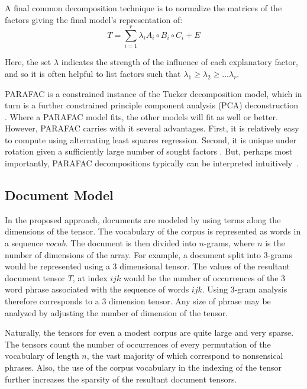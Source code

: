 \documentclass{article}
\begin{document}
A final common decomposition technique is to normalize the matrices
of the factors giving the final model's representation of:
\begin{equation}
    \label{eq:parafac-lambda}
    T = \displaystyle\sum_{i=1}^{r} \lambda_i A_i \circ B_i \circ C_i
    + E
\end{equation}

Here, the set $\lambda$ indicates the strength of the influence of
each explanatory factor, and so it is often helpful to list factors
such that $\lambda_1 \geq \lambda_2 \geq \ldots \lambda_r$.

PARAFAC is a constrained instance of the Tucker decomposition model,
which in turn is a further constrained principle component analysis
(PCA) deconstruction \cite{bro1997}.  Where a PARAFAC model fits, the
other models will fit as well or better.  However, PARAFAC carries
with it several advantages.  First, it is relatively easy to compute
using alternating least squares regression.  Second, it is unique
under rotation given a sufficiently large number of sought factors
\cite{harshman1970}.  But, perhaps most importantly, PARAFAC
decompositions typically can be interpreted
intuitively~\cite{bro1997}.  

\subsection{Document Model}
In the proposed approach, documents are modeled by using terms along
the dimensions of the tensor.  The vocabulary of the corpus is
represented as words in a sequence $vocab$. 
The document is then divided into
$n$-grams, where $n$ is the number of dimensions of the array.  For
example, a document split into 3-grams would be represented using
a 3 dimensional tensor.  The values of the resultant document tensor
$T$, at index $ijk$ would be the number of occurrences of the 3 word
phrase associated with the sequence of words $ijk$.  Using 3-gram
analysis therefore corresponds to a 3 dimension tensor.  Any size of
phrase may be analyzed by adjusting the number of dimension of the
tensor.

Naturally, the tensors for even a modest corpus are quite large and
very sparse.  The tensors count the number of occurrences of every
permutation of the vocabulary of length $n$, the vast majority of
which correspond to nonsensical phrases.  Also, the use of the corpus
vocabulary in the indexing of the tensor further increases the
sparsity of the resultant document tensors.
\end{document}
